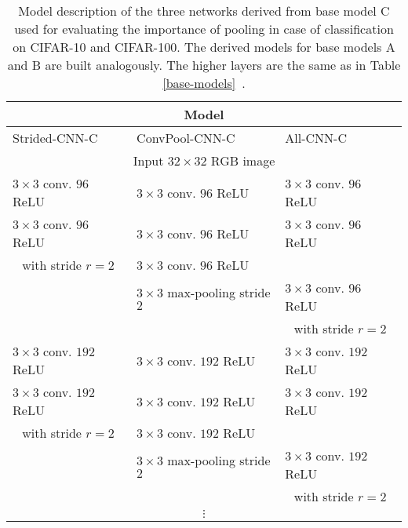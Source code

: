 \documentclass{article} \usepackage{iclr2015,times}
\begin{document}
\begin{table}[h]
\caption{Model description of the three networks derived from base model C used for evaluating the importance of pooling in case of classification on CIFAR-10 and CIFAR-100. The derived models for base models A and B are built analogously. The higher layers are the same as in Table \ref{base-models}~.}
\label{derived-models}
\begin{center}
\begin{small}
\begin{tabular}{l|l|l}
\multicolumn{3}{c}{\bf Model} \\
\hline
Strided-CNN-C         &  ConvPool-CNN-C & All-CNN-C \\
\hline
\multicolumn{3}{c}{Input $32 \times 32$ RGB image} \\
\hline
$3 \times 3$ conv. $96$ ReLU  & $3 \times 3$ conv. $96$ ReLU  & $3 \times 3$ conv. $96$ ReLU  \\
$3 \times 3$ conv. $96$ ReLU  & $3 \times 3$ conv. $96$ ReLU  & $3 \times 3$ conv. $96$ ReLU  \\
\multicolumn{1}{c|}{with stride $r = 2$}    & $3 \times 3$ conv. $96$ ReLU  &  \\
\hline 
                                   & $3 \times 3$ max-pooling stride $2$ & $3 \times 3$ conv. $96$ ReLU  \\
                                   &                                     & \multicolumn{1}{c}{with stride $r = 2$} \\
\hline
$3 \times 3$ conv. $192$ ReLU & $3 \times 3$ conv. $192$ ReLU & $3 \times 3$ conv. $192$ ReLU \\
$3 \times 3$ conv. $192$ ReLU & $3 \times 3$ conv. $192$ ReLU  & $3 \times 3$ conv. $192$ ReLU \\
\multicolumn{1}{c|}{with stride $r = 2$}    & $3 \times 3$ conv. $192$ ReLU &  \\
\hline
                                   & $3 \times 3$ max-pooling stride $2$ & $3 \times 3$ conv. $192$ ReLU \\
                                   &                                     & \multicolumn{1}{c}{with stride $r = 2$} \\
\hline
\multicolumn{3}{c}{$\vdots$} \\
\end{tabular}
\end{small}
\end{center}
\end{table}
\end{document}
